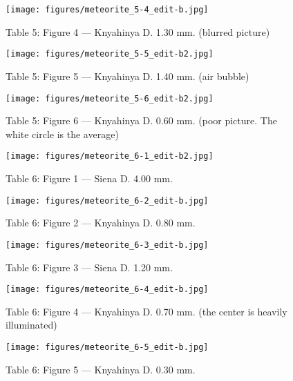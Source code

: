 \documentclass[a4paper, 12pt, oneside]{article}
\begin{document}
\clearpage
\begin{figure}[t]
\texttt{[image: figures/meteorite\_5-4\_edit-b.jpg]}
\caption{Table 5: Figure 4 --- Knyahinya D. 1.30 mm. (blurred picture)}
\centering
\end{figure}
\clearpage
\begin{figure}[t]
\texttt{[image: figures/meteorite\_5-5\_edit-b2.jpg]}
\caption{Table 5: Figure 5 --- Knyahinya D. 1.40 mm. (air bubble)}
\centering
\end{figure}
\clearpage
\begin{figure}[t]
\texttt{[image: figures/meteorite\_5-6\_edit-b2.jpg]}
\caption{Table 5: Figure 6 --- Knyahinya D. 0.60 mm. (poor picture. The white circle is the average)}
\centering
\end{figure}
\clearpage
{}
\begin{figure}[t]
\texttt{[image: figures/meteorite\_6-1\_edit-b2.jpg]}
\caption{Table 6: Figure 1 --- Siena D. 4.00 mm.}
\centering
\end{figure}
\clearpage
\begin{figure}[t]
\texttt{[image: figures/meteorite\_6-2\_edit-b.jpg]}
\caption{Table 6: Figure 2 --- Knyahinya D. 0.80 mm.}
\centering
\end{figure}
\clearpage
\begin{figure}[t]
\texttt{[image: figures/meteorite\_6-3\_edit-b.jpg]}
\caption{Table 6: Figure 3 --- Siena D. 1.20 mm.}
\centering
\end{figure}
\clearpage
\begin{figure}[t]
\texttt{[image: figures/meteorite\_6-4\_edit-b.jpg]}
\caption{Table 6: Figure 4 --- Knyahinya D. 0.70 mm. (the center is heavily illuminated)}
\centering
\end{figure}
\clearpage
\begin{figure}[t]
\texttt{[image: figures/meteorite\_6-5\_edit-b.jpg]}
\caption{Table 6: Figure 5 --- Knyahinya D. 0.30 mm.}
\centering
\end{figure}
\end{document}
